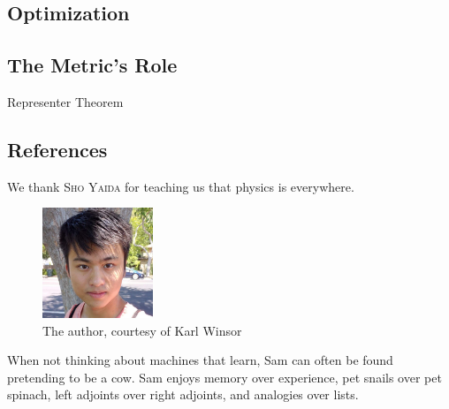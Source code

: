 \documentclass[twocolumn, 11pt]{article}
\theoremstyle{definition}
\newcommand{\msec}[1]{\subsection*{\color{mblu}\textsf{#1}}}
\begin{document}

    \msec{Optimization}
    \msec{The Metric's Role}
        Representer Theorem
    \msec{}
    \msec{}

    \msec{References}
        We thank \textsc{Sho Yaida} for teaching us that physics is everywhere.

        \hrulefill
        \vspace{0.4cm}
            \begin{figure}
                \vspace{-0.4cm}
                    \includegraphics[height=3.3cm]{sam}
                \caption*{The author, courtesy of Karl Winsor}
            \end{figure}
            When not thinking about machines that learn, Sam can often be found
            pretending to be a cow.  Sam enjoys memory over experience, pet
            snails over pet spinach, left adjoints over right adjoints, and
            analogies over lists.
\end{document}
